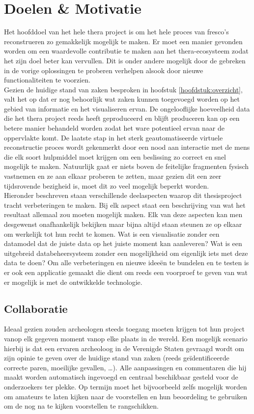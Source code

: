 \chapter{Doelen \& Motivatie}
\label{hoofdstuk:doelen}

Het hoofddoel van het hele thera project is om het hele proces van fresco's reconstrueren zo gemakkelijk mogelijk te maken. Er moet een manier gevonden worden om een waardevolle contributie te maken aan het thera-ecosysteem zodat het zijn doel beter kan vervullen. Dit is onder andere mogelijk door de gebreken in de vorige oplossingen te proberen verhelpen alsook door nieuwe functionaliteiten te voorzien.\\

Gezien de huidige stand van zaken besproken in hoofstuk \ref{hoofdstuk:overzicht}, valt het op dat er nog behoorlijk wat zaken kunnen toegevoegd worden op het gebied van informatie en het visualiseren ervan. De ongelooflijke hoeveelheid data die het thera project reeds heeft geproduceerd en blijft produceren kan op een betere manier behandeld worden zodat het ware potentieel ervan naar de oppervlakte komt. De laatste stap in het sterk geautomatiseerde virtuele reconstructie proces wordt gekenmerkt door een nood aan interactie met de mens die elk soort hulpmiddel moet krijgen om een beslissing zo correct en snel mogelijk te maken. Natuurlijk gaat er niets boven de feitelijke fragmenten fysisch vastnemen en ze aan elkaar proberen te zetten, maar gezien dit een zeer tijdsrovende bezigheid is, moet dit zo veel mogelijk beperkt worden.\\

Hieronder beschreven staan verschillende deelaspecten waarop dit thesisproject tracht verbeteringen te maken. Bij elk aspect staat een beschrijving van wat het resultaat allemaal zou moeten mogelijk maken. Elk van deze aspecten kan men desgewenst onafhankelijk bekijken maar bijna altijd staan steunen ze op elkaar om werkelijk tot hun recht te komen. Wat is een visualisatie zonder een datamodel dat de juiste data op het juiste moment kan aanleveren? Wat is een uitgebreid databeheersysteem zonder een mogelijkheid om eigenlijk iets met deze data te doen? Om alle verbeteringen en nieuwe idee\"en te bundelen en te testen is er ook een applicatie gemaakt die dient om reeds een voorproef te geven van wat er mogelijk is met de ontwikkelde technologie.  

\section{Collaboratie}
Ideaal gezien zouden archeologen steeds toegang moeten krijgen tot hun project vanop elk gegeven moment vanop elke plaats in de wereld. Een mogelijk scenario hierbij is dat een ervaren archeoloog in de Verenigde Staten gevraagd wordt om zijn opinie te geven over de huidige stand van zaken (reeds ge\"identificeerde correcte paren, moeilijke gevallen, \ldots). Alle aanpassingen en commentaren die hij maakt worden automatisch ingevoegd en centraal beschikbaar gesteld voor de onderzoekers ter plekke. Op termijn moet het bijvoorbeeld zelfs mogelijk worden om amateurs te laten kijken naar de voorstellen en hun beoordeling te gebruiken om de nog na te kijken voorstellen te rangschikken.

